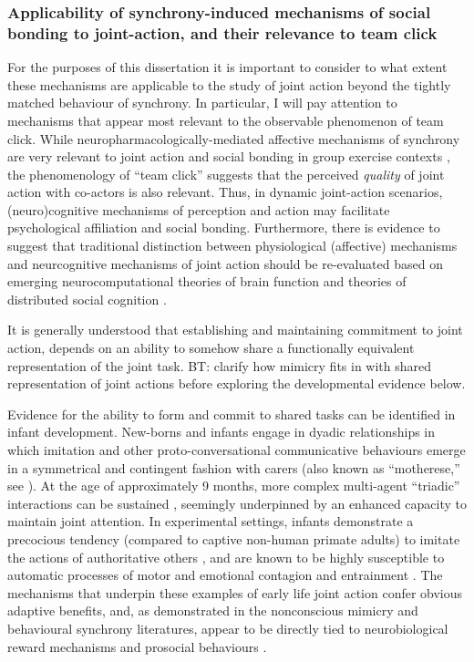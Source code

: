 \subsubsection{Applicability of synchrony-induced mechanisms of social bonding to joint-action, and their relevance to team click}
For the purposes of this dissertation it is important to consider to what extent these mechanisms are applicable to the study of joint action beyond the tightly matched behaviour of synchrony.  In particular, I will pay attention to mechanisms that appear most relevant to the observable phenomenon of team click. While neuropharmacologically-mediated affective mechanisms of synchrony are very relevant to joint action and social bonding in group exercise contexts \citep[see]{Cohen2009,Sullivan2013,Tarr2015}, the phenomenology of ``team click'' suggests that the perceived \textit{quality} of joint action with co-actors is also relevant.  Thus, in dynamic joint-action scenarios, (neuro)cognitive mechanisms of perception and action may facilitate psychological affiliation and social bonding.  Furthermore, there is evidence to suggest that traditional distinction between physiological (affective) mechanisms and neurcognitive mechanisms of joint action should be re-evaluated based on emerging neurocomputational theories of brain function and theories of distributed social cognition \citep{Pessoa2013,Pessoa2014,Miller2017}.


It is generally understood that establishing and maintaining commitment to joint action, depends on an ability to somehow share a functionally equivalent representation of the joint task\citep{Vesper2010,Michael2016}.  BT: clarify how mimicry fits in with shared representation of joint actions before exploring the developmental evidence below.

Evidence for the ability to form and commit to shared tasks can be identified in infant development.  New-borns and infants engage in dyadic relationships in which imitation and other proto-conversational communicative behaviours emerge in a symmetrical and contingent fashion with carers (also known as ``motherese,'' see \cite{Braten2007}). At the age of approximately 9 months, more complex multi-agent ``triadic'' interactions can be sustained \citep{Colle2008}, seemingly underpinned by an enhanced capacity to maintain joint attention.
In experimental settings, infants demonstrate a precocious tendency (compared to captive non-human primate adults) to imitate the actions of authoritative others \citep{Tomasello2014}, and are known to be highly susceptible to automatic processes of motor and emotional contagion and entrainment \citep{Bargh2012}. The mechanisms that underpin these examples of early life joint action confer obvious adaptive benefits, and, as demonstrated in the nonconscious mimicry and behavioural synchrony literatures, appear to be directly tied to neurobiological reward mechanisms and prosocial behaviours \citep{Hurley2008,Launay2016}.

